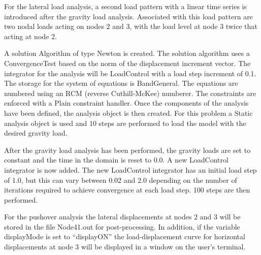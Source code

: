 \documentclass[12pt]{article}
\begin{document}
For the lateral load analysis, a second load pattern
with a linear time series is introduced after the gravity load
analysis. Associated with this load pattern are two nodal loads acting
on nodes 2 and 3, with the load level at node 3 twice that acting at
node 2. 



\vspace{0.2in}

A solution Algorithm of type Newton is created. The solution
algorithm uses a ConvergenceTest based on the norm
of the displacement increment vector. The integrator for the analysis
will be LoadControl with a load step increment of 0.1. The storage for
the system of equations is BandGeneral. The equations are numbered
using an RCM (reverse Cuthill-McKee) numberer. The constraints are
enforced with a Plain constraint handler. Once the components of the
analysis have been defined, the analysis object is then created. For
this problem a Static analysis object is used and 10 steps
are performed to load the model with the desired gravity load.

After the gravity load analysis has been performed, the gravity loads
are set to constant and the time in the domain is reset to 0.0. A new
LoadControl integrator is now added. The new LoadControl integrator
has an initial load step of 1.0, but this can vary between 0.02 and
2.0 depending on the number of iterations required to achieve
convergence at each load step. 100 steps are then performed.


\vspace{0.2in} 

For the pushover analysis the lateral displacements at nodes
2 and 3 will be stored in the file Node41.out for post-processing. In
addition, if the variable displayMode is set to ``displayON'' the
load-displacement curve for horizontal displacements at node 3 will 
be displayed in a window on the user's terminal.
\end{document}
